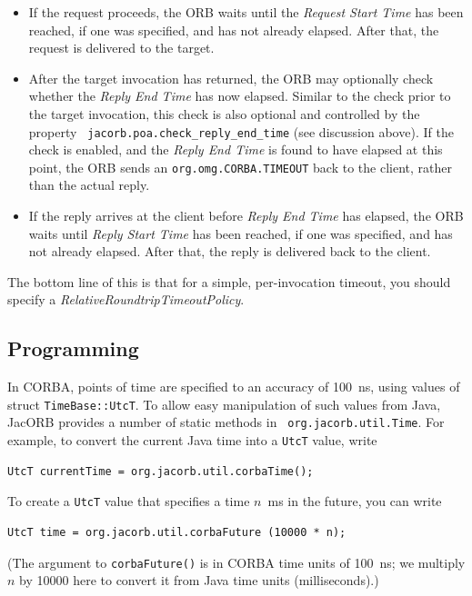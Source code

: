\begin{itemize}
\item If the request proceeds, the ORB waits until the \emph{Request
Start Time} has been reached, if one was specified, and has not
already elapsed.  After that, the request is delivered to the target.

\item After the target invocation has returned, the ORB may
optionally check whether the \emph{Reply End Time} has now elapsed.
Similar to the check prior to the target invocation, this check is
also optional and controlled by the property {\tt
jacorb.poa.check\_reply\_end\_time} (see discussion above).  If
the check is enabled, and the \emph{Reply End Time} is found to have
elapsed at this point, the ORB sends an {\tt org.omg.CORBA.TIMEOUT}
back to the client, rather than the actual reply.

\item If the reply arrives at the client before \emph{Reply End Time}
has elapsed, the ORB waits until \emph{Reply Start Time} has been
reached, if one was specified, and has not already elapsed.  After
that, the reply is delivered back to the client.

\end{itemize}

The bottom line of this is that for a simple, per-invocation timeout,
you should specify a \mbox{\emph{RelativeRoundtripTimeoutPolicy}}.

\clearpage{}
\subsection*{Programming}

In CORBA, points of time are specified to an accuracy of 100~ns, using
values of struct {\tt TimeBase::UtcT}.  To allow easy manipulation of such
values from Java, JacORB provides a number of static methods in {\tt
org.jacorb.util.Time}.  For example, to convert the current Java time
into a {\tt UtcT} value, write

\begin{verbatim}
UtcT currentTime = org.jacorb.util.corbaTime();
\end{verbatim}

To create a {\tt UtcT} value that specifies a time $n$~ms in the
future, you can write

\begin{verbatim}
UtcT time = org.jacorb.util.corbaFuture (10000 * n);
\end{verbatim}

(The argument to {\tt corbaFuture()} is in CORBA time units of
100~ns; we multiply $n$ by 10000 here to convert it from Java time
units (milliseconds).)

